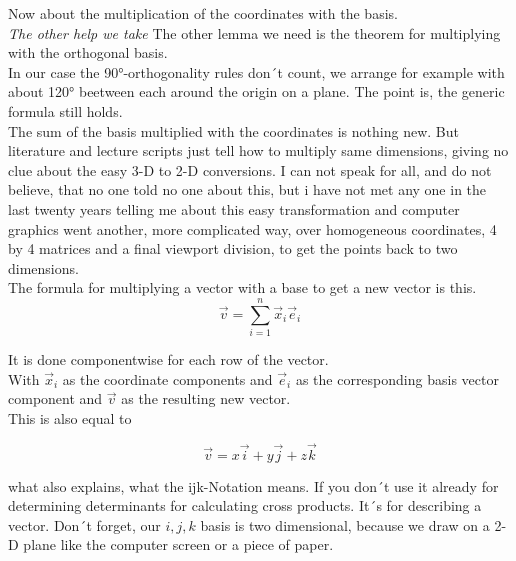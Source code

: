 \documentclass{article}
\begin{document}
Now about the multiplication of the coordinates with the basis.\\

\emph{The other help we take} The other lemma we need is the theorem for 
multiplying with the orthogonal basis.\\

In our case the 90°-orthogonality rules don´t count, we arrange for example with about 120° beetween each around the origin on a plane. The point is, the generic formula still holds.\\

 The sum of the basis multiplied with the coordinates is nothing
new. But literature and lecture scripts just tell how to multiply
same dimensions, giving no clue about the easy 3-D to 2-D conversions.
I can not speak for all, and do not believe, that no one told no one about this, 
but i have not met any one in the last twenty years telling me about this easy 
transformation and computer graphics went another, more complicated way, over
homogeneous coordinates, 4 by 4 matrices and a final viewport division, to get
the points back to two dimensions.\\

The formula for multiplying a vector with a base to get a new vector is this. \\

\begin{displaymath}
\vec{v} = \displaystyle\sum_{i=1}^{n} \vec{x}_i\vec{e}_i
\end{displaymath}

It is done componentwise for each row of the vector.\\
With $\vec{x}_i$ as the coordinate components and $\vec{e}_i$ as the corresponding basis vector component and $\vec{v}$ as the resulting new vector.\\

This is also equal to

\begin{displaymath}
\vec{v} = x\vec{i} + y\vec{j} + z\vec{k}
\end{displaymath}

what also explains, what the ijk-Notation means. If you don´t use it already for determining determinants for
calculating cross products. It´s for describing a vector. Don´t forget, our $i, j, k$ basis is two dimensional, 
because we draw on a 2-D plane like the computer screen or a piece of paper. \\
\end{document}
